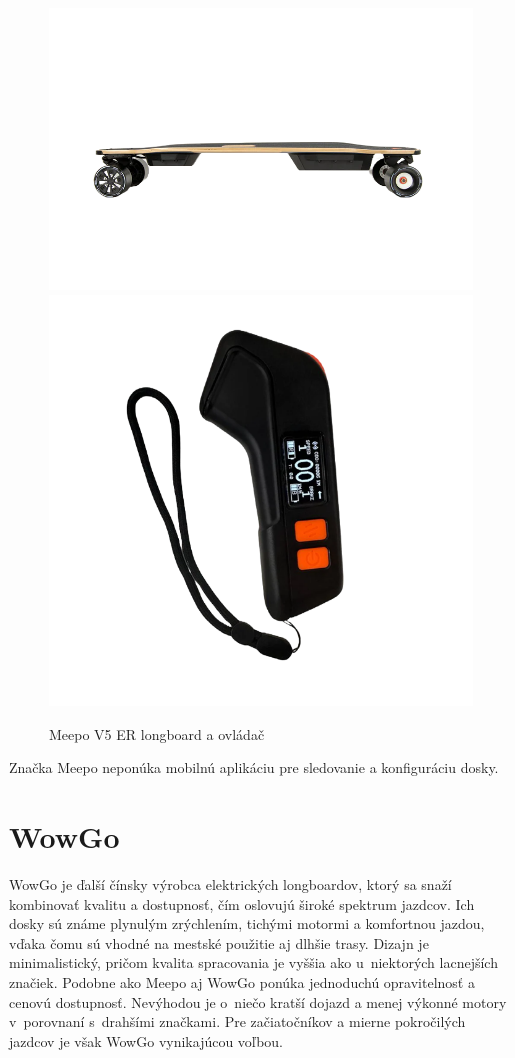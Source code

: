 \begin{figure}[h]
    \centering
    \includegraphics[width=0.48\linewidth]{obrazky-figures/brand-reviews/meepo-longboard.png}\hfill
    \includegraphics[width=0.48\linewidth]{obrazky-figures/brand-reviews/meepo-controller.png}
    \caption{Meepo V5 ER longboard a ovládač\cite{Meepo}}\label{fig:meepo}
\end{figure}

Značka Meepo neponúka mobilnú aplikáciu pre sledovanie a konfiguráciu dosky.\cite{Meepo}

\section{WowGo}
WowGo je ďalší čínsky výrobca elektrických longboardov, ktorý sa snaží kombinovať kvalitu a dostupnosť, čím oslovujú široké spektrum jazdcov. 
Ich dosky sú známe plynulým zrýchlením, tichými motormi a komfortnou jazdou, vďaka čomu sú vhodné na mestské použitie aj dlhšie trasy. 
Dizajn je minimalistický, pričom kvalita spracovania je vyššia ako u~niektorých lacnejších značiek.
Podobne ako Meepo aj WowGo ponúka jednoduchú opravitelnosť a cenovú dostupnosť. 
Nevýhodou je o~niečo kratší dojazd a menej výkonné motory v~porovnaní s~drahšími značkami. 
Pre začiatočníkov a mierne pokročilých jazdcov je však WowGo vynikajúcou voľbou.

